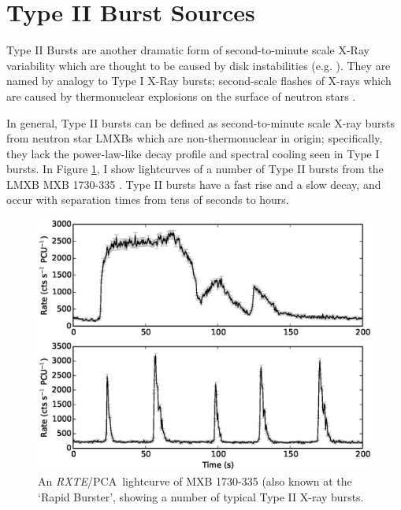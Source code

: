 \section{Type II Burst Sources}

\label{sec:TypeII}

\par {}Type II Bursts are another dramatic form of second-to-minute scale X-Ray variability which are thought to be caused by disk instabilities (e.g. \citealp{Lewin_TypeII}).  They are named by analogy to Type I X-Ray bursts; second-scale flashes of X-rays which are caused by thermonuclear explosions on the surface of neutron stars \citep{vanParadijs_TypeI,Lewin_Bursts}.
\par In general, Type II bursts can be defined as second-to-minute scale X-ray bursts from neutron star LMXBs which are non-thermonuclear in origin; specifically, they lack the power-law-like decay profile \citep{intZand_Decay} and spectral cooling \citep{Hoffman_T1Cool} seen in Type I bursts.  In Figure \ref{fig:BgB}, I show lightcurves of a number of Type II bursts from the LMXB MXB 1730-335 \citep{Bagnoli_PopStudy}.  Type II bursts have a fast rise and a slow decay, and occur with separation times from tens of seconds to hours.

\begin{figure}
  \centering
  \includegraphics[width=.9\linewidth, trim= 0mm 0mm 0mm 80mm,clip]{images/bagnoli_bursts.eps}
  \caption[An \textit{RXTE}/PCA lightcurve of the Rapid Burster, showing a number of typical Type II X-ray bursts.]{An \textit{RXTE}/PCA\indexrxte\indexpca\ lightcurve of MXB 1730-335 (also known at the `Rapid Burster', showing a number of typical Type II X-ray bursts.}
  \label{fig:BgB}
\end{figure}

